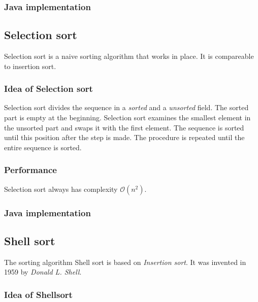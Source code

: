 \documentclass[nobranding]{pfBook}
\newcommand{\OO}{\mathcal{O}}
\begin{document}
	\subsubsection{Java implementation}
	
	
	
	\subsection{Selection sort}
	
	Selection sort is a naive sorting algorithm that works in place. It is compareable to insertion sort.
	
	\subsubsection{Idea of Selection sort}
	
	Selection sort divides the sequence in a \emph{sorted} and a \emph{unsorted} field. The sorted part is empty at the beginning. Selection sort examines the smallest element in the unsorted part and swaps it with the first element. The sequence is sorted until this position after the step is made. The procedure is repeated until the entire sequence is sorted.
	
	\subsubsection{Performance}
	
	Selection sort always has complexity $\OO(n^2)$.
	
	\subsubsection{Java implementation}
	
	
	
	\subsection{Shell sort}
	
	The sorting algorithm Shell sort is based on \emph{Insertion sort}. It was invented in 1959 by \emph{Donald L. Shell}.
	
	\subsubsection{Idea of Shellsort}
	
\end{document}
